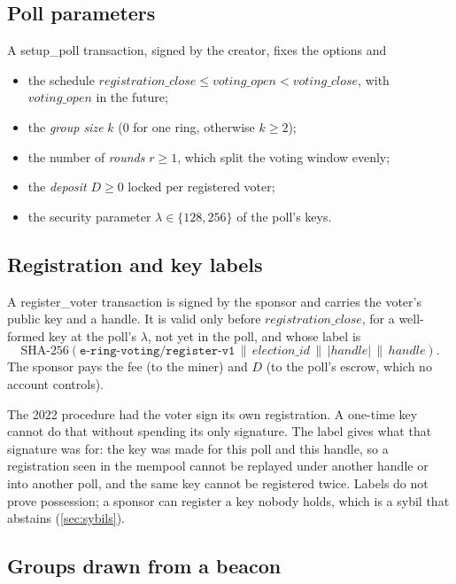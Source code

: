 \documentclass[11pt,a4paper]{article}
\theoremstyle{definition}
\begin{document}
\subsection{Poll parameters}

A \textsf{setup\_poll} transaction, signed by the creator, fixes the
options and
\begin{itemize}[leftmargin=*]
\item the schedule $\mathit{registration\_close} \le \mathit{voting\_open}
      < \mathit{voting\_close}$, with $\mathit{voting\_open}$ in the future;
\item the \emph{group size} $k$ ($0$ for one ring, otherwise $k \ge 2$);
\item the number of \emph{rounds} $r \ge 1$, which split the voting
      window evenly;
\item the \emph{deposit} $D \ge 0$ locked per registered voter;
\item the security parameter $\lambda \in \{128, 256\}$ of the poll's keys.
\end{itemize}

\subsection{Registration and key labels}
\label{sec:labels}

A \textsf{register\_voter} transaction is signed by the sponsor and
carries the voter's public key and a handle. It is valid only before
$\mathit{registration\_close}$, for a well-formed key at the poll's
$\lambda$, not yet in the poll, and whose label is
\[
\mathrm{SHA\text{-}256}(\texttt{e-ring-voting/register-v1} \,\|\,
\mathit{election\_id} \,\|\, |\mathit{handle}| \,\|\, \mathit{handle}).
\]
The sponsor pays the fee (to the miner) and $D$ (to the poll's escrow,
which no account controls).

The 2022 procedure had the voter sign its own registration. A one-time
key cannot do that without spending its only signature. The label gives
what that signature was for: the key was made for this poll and this
handle, so a registration seen in the mempool cannot be replayed under
another handle or into another poll, and the same key cannot be
registered twice. Labels do not prove possession; a sponsor can register
a key nobody holds, which is a sybil that abstains (\cref{sec:sybils}).

\subsection{Groups drawn from a beacon}
\label{sec:groups}
\end{document}
